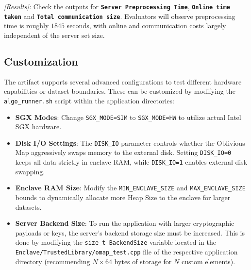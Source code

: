 \documentclass[conference]{IEEEtran}
\begin{document}
\textit{[Results]:} Check the outputs for \textbf{\texttt{Server Preprocessing Time}}, \textbf{\texttt{Online time taken}} and \textbf{\texttt{Total communication size}}. Evaluators will observe preprocessing time is roughly $1845$ seconds, with online and communication costs largely independent of the server set size.


\subsection{Customization}
The artifact supports several advanced configurations to test different hardware capabilities or dataset boundaries. These can be customized by modifying the \texttt{algo\_runner.sh} script within the application directories:

\begin{itemize}
    \item \textbf{SGX Modes}: Change \texttt{SGX\_MODE=SIM} to \texttt{SGX\_MODE=HW} to utilize actual Intel SGX hardware.
    \item \textbf{Disk I/O Settings}: The \texttt{DISK\_IO} parameter controls whether the Oblivious Map aggressively swaps memory to the external disk. Setting \texttt{DISK\_IO=0} keeps all data strictly in enclave RAM, while \texttt{DISK\_IO=1} enables external disk swapping.
    \item \textbf{Enclave RAM Size}: Modify the \texttt{MIN\_ENCLAVE\_SIZE} and \texttt{MAX\_ENCLAVE\_SIZE} bounds to dynamically allocate more Heap Size to the enclave for larger datasets.
    \item \textbf{Server Backend Size}: To run the application with larger cryptographic payloads or keys, the server's backend storage size must be increased. This is done by modifying the \texttt{size\_t BackendSize} variable located in the \texttt{Enclave/TrustedLibrary/omap\_test.cpp} file of the respective application directory (recommending $N \times 64$ bytes of storage for $N$ custom elements).
\end{itemize}


\end{document}
